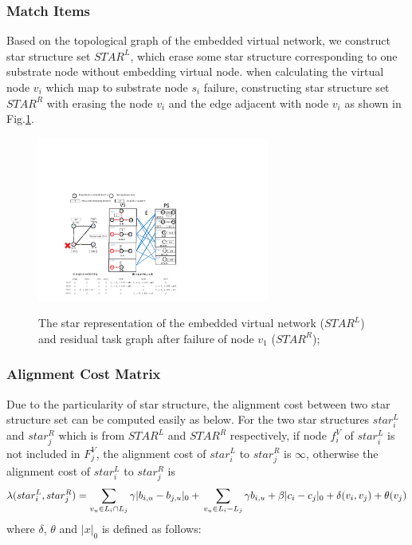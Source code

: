 \subsubsection{Match Items}
Based on the topological graph of the embedded virtual network, we construct star structure set $STAR^L$, which erase some star structure corresponding to one substrate node without embedding virtual node. when calculating the virtual node $v_i$ which map to substrate node $s_i$ failure, constructing star structure set $STAR^R$ with erasing the node $v_i$ and the edge adjacent with node $v_i$ as shown in Fig.\ref{fig:StarRepresentation}.
\begin{figure}
\centering
\includegraphics[width=3in]{Fig/StarRepresentation}\\
  \caption{The star representation of the embedded virtual network ($STAR^L$) and residual task graph after failure of node $v_1$ ($STAR^R$);}\label{fig:StarRepresentation}
\end{figure}
\subsubsection{Alignment Cost Matrix}
Due to the particularity of star structure, the alignment cost between two star structure set can be computed easily as below. For the two star structures $star^L_i$ and $star^R_j$ which is from $STAR^L$ and $STAR^R$ respectively, if node $f_i^V$ of $star^L_i$  is not included in $F^V_j$, the alignment cost of $star^L_i$ to $star^R_j$ is $\infty$, otherwise the alignment cost of $star^L_i$ to $star^R_j$ is
\[\lambda(star^L_i,star^R_j)=\sum\limits_{v_u\in L_i \cap L_j}\gamma|b_{i,u}-b_{j,u}|_0+\newline
\sum\limits_{v_u\in L_i - L_j}\gamma b_{i,u}+\beta|c_i-c_j|_0+ \delta(v_i,v_j)+\theta(v_j)\]
where $\delta$, $\theta$ and $|x|_0$ is defined as follows:


